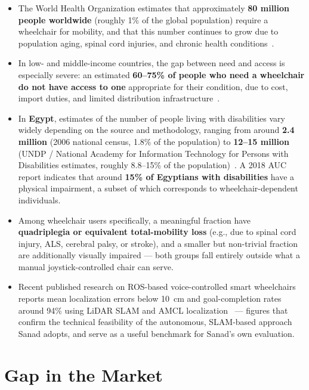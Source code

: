 \begin{itemize}
    \item The World Health Organization estimates that approximately \textbf{80 million people worldwide} (roughly 1\% of the global population) require a wheelchair for mobility, and that this number continues to grow due to population aging, spinal cord injuries, and chronic health conditions~\cite{who2023wheelchair}.
    \item In low- and middle-income countries, the gap between need and access is especially severe: an estimated \textbf{60--75\% of people who need a wheelchair do not have access to one} appropriate for their condition, due to cost, import duties, and limited distribution infrastructure~\cite{ameco2025wheelchairmarket, ncbi2024wheelchairprovision}.
    \item In \textbf{Egypt}, estimates of the number of people living with disabilities vary widely depending on the source and methodology, ranging from around \textbf{2.4 million} (2006 national census, 1.8\% of the population) to \textbf{12--15 million} (UNDP / National Academy for Information Technology for Persons with Disabilities estimates, roughly 8.8--15\% of the population)~\cite{wikipedia2023disabilityegypt, egyptianstreets2024disability, naid2026about}. A 2018 AUC report indicates that around \textbf{15\% of Egyptians with disabilities} have a physical impairment, a subset of which corresponds to wheelchair-dependent individuals.
    \item Among wheelchair users specifically, a meaningful fraction have \textbf{quadriplegia or equivalent total-mobility loss} (e.g., due to spinal cord injury, ALS, cerebral palsy, or stroke), and a smaller but non-trivial fraction are additionally visually impaired --- both groups fall entirely outside what a manual joystick-controlled chair can serve.
    \item Recent published research on ROS-based voice-controlled smart wheelchairs reports mean localization errors below 10~cm and goal-completion rates around 94\% using LiDAR SLAM and AMCL localization~\cite{benayed2026voicecontrolled} --- figures that confirm the technical feasibility of the autonomous, SLAM-based approach Sanad adopts, and serve as a useful benchmark for Sanad's own evaluation.
\end{itemize}


\section{Gap in the Market}

